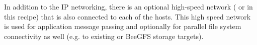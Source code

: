 In addition to the IP networking, there is an optional high-speed network
(\InfiniBand{} or \OmniPath{} in this recipe) that is also connected to each of the
hosts. This high speed network is used for application message passing and
optionally for parallel file system connectivity as well (e.g. to
existing \Lustre{} or BeeGFS storage targets).
\fi
